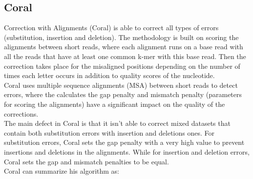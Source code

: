 \documentclass[12pt,openany]{llncs}
\begin{document}
\subsection{Coral}
Correction with Alignments (Coral) \cite{Coral} is able to correct all types of errors (substitution, insertion and deletion). The methodology is built on scoring the alignments between short reads, where each alignment runs on a base read with all the reads that have at least one common k-mer with this base read. Then the correction takes place for the misaligned positions depending on the number of times each letter occurs in addition to quality scores of the nucleotide.
\\
Coral uses multiple sequence alignments (MSA) \cite{coral-alignment} between short reads to detect errors, where the calculates the gap penalty and mismatch penalty (parameters for scoring the alignments) have a significant impact on the quality of the corrections. 
\\
The main defect in Coral is that it isn't able to correct mixed datasets that contain both substitution errors with insertion and deletions ones.
For substitution errors, Coral sets the gap penalty with a very high value to prevent insertions and deletions in the alignments. While for insertion and deletion errors, Coral sets the gap and mismatch penalties to be equal.
\\
Coral can summarize his algorithm as:
\end{document}
